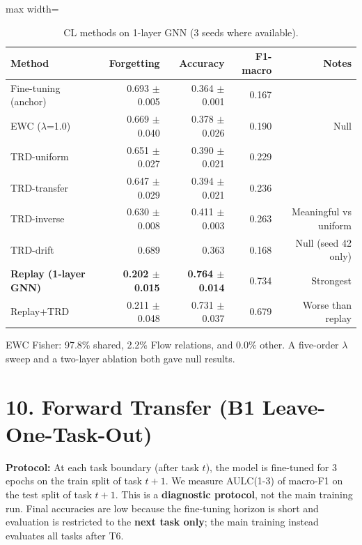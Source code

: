 \documentclass[11pt,a4paper]{article}
\begin{document}
\begin{table}[H]
\centering
\caption{CL methods on 1-layer GNN (3 seeds where available).}
\label{tab:method-comparison}
\begin{adjustbox}{max width=\textwidth}
\begin{tabular}{lrrrr}
\toprule
Method & Forgetting & Accuracy & F1-macro & Notes \\
\midrule
Fine-tuning (anchor) & 0.693 $\pm$ 0.005 & 0.364 $\pm$ 0.001 & 0.167 & \\
EWC ($\lambda$=1.0) & 0.669 $\pm$ 0.040 & 0.378 $\pm$ 0.026 & 0.190 & Null \\
TRD-uniform & 0.651 $\pm$ 0.027 & 0.390 $\pm$ 0.021 & 0.229 & \\
TRD-transfer & 0.647 $\pm$ 0.029 & 0.394 $\pm$ 0.021 & 0.236 & \\
TRD-inverse & 0.630 $\pm$ 0.008 & 0.411 $\pm$ 0.003 & 0.263 & Meaningful vs uniform \\
TRD-drift & 0.689 & 0.363 & 0.168 & Null (seed 42 only) \\
\textbf{Replay (1-layer GNN)} & \textbf{0.202 $\pm$ 0.015} & \textbf{0.764 $\pm$ 0.014} & 0.734 & Strongest \\
Replay+TRD & 0.211 $\pm$ 0.048 & 0.731 $\pm$ 0.037 & 0.679 & Worse than replay \\
\bottomrule
\end{tabular}
\end{adjustbox}
\end{table}

EWC Fisher: 97.8\% shared, 2.2\% Flow relations, and 0.0\% other. A five-order $\lambda$ sweep and a two-layer ablation both gave null results.

\section*{10. Forward Transfer (B1 Leave-One-Task-Out)}
\textbf{Protocol:} At each task boundary (after task $t$), the model is fine-tuned for 3 epochs on the train split of task $t+1$. We measure AULC(1-3) of macro-F1 on the test split of task $t+1$. This is a \textbf{diagnostic protocol}, not the main training run. Final accuracies are low because the fine-tuning horizon is short and evaluation is restricted to the \textbf{next task only}; the main training instead evaluates all tasks after T6.
\end{document}
